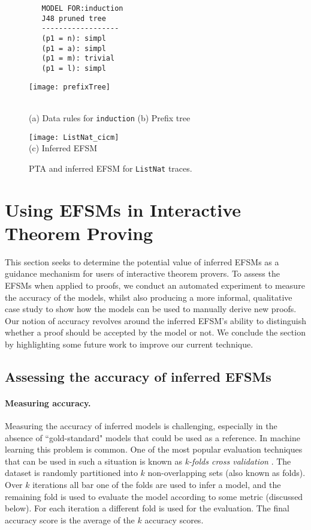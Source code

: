 \documentclass{llncs}
\begin{document}
\begin{figure}
\centering
\begin{minipage}[b]{0.2\textwidth}
\begin{verbatim}
   MODEL FOR:induction
   J48 pruned tree
   ------------------
   (p1 = n): simpl 
   (p1 = a): simpl 
   (p1 = m): trivial 
   (p1 = l): simpl 
\end{verbatim}
\vspace{2cm}
\end{minipage}
\hspace{2cm}\begin{minipage}[b]{0.5\textwidth}\texttt{[image: prefixTree]}\end{minipage}\\
(a) Data rules for {\tt induction} \hspace{4cm} (b) Prefix tree

\hspace*{-1cm}\texttt{[image: ListNat\_cicm]}\\
(c) Inferred EFSM
\caption{PTA and inferred EFSM for {\tt ListNat} traces. }
\label{fig:model}
\end{figure}

\section{Using EFSMs in Interactive Theorem Proving}
\label{sec:using}
This section seeks to determine the potential value of inferred EFSMs as a guidance mechanism for users of interactive theorem provers. To assess the EFSMs when applied to proofs, we conduct an automated experiment to measure the accuracy of the models, whilst also producing a more informal, qualitative case study to show how the models can be used to manually derive new proofs. Our notion of accuracy revolves around the inferred EFSM's ability to distinguish whether a proof should be accepted by the model or not. We conclude the section by highlighting some future work to improve our current technique.

\subsection{Assessing the accuracy of inferred EFSMs}
\paragraph{Measuring accuracy.}
Measuring the accuracy of inferred models is challenging, especially in the absence of ``gold-standard" models that could be used as a reference. In machine learning this problem is common. One of the most popular evaluation techniques that can be used in such a situation is known as \emph{k-folds cross validation} \cite{Kohavi95}. The dataset is randomly partitioned into $k$ non-overlapping sets (also known as folds). Over $k$ iterations all bar one of the folds are used to infer a model, and the remaining fold is used to evaluate the model according to some metric (discussed below). For each iteration a different fold is used for the evaluation. The final accuracy score is the average of the $k$ accuracy scores.
\end{document}
